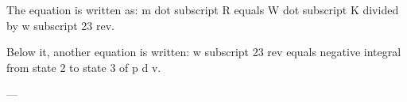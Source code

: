 The equation is written as:  
m dot subscript R equals W dot subscript K divided by w subscript 23 rev.  

Below it, another equation is written:  
w subscript 23 rev equals negative integral from state 2 to state 3 of p d v.  

---